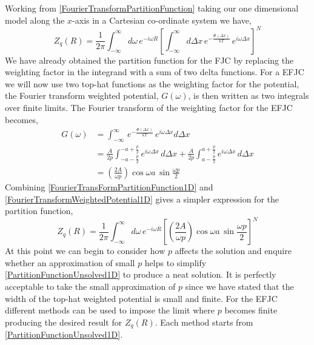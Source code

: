 Working from \eqref{FourierTransformPartitionFunction} taking our one dimensional model along the $x$-axis in a Cartesian co-ordinate system we have,
%
\begin{equation}
Z_{q}\left(R\right)=\frac{1}{2\pi}\int_{-\infty}^{\infty}d\omega\, e^{-i\omega R}\left[\int_{-\infty}^{\infty}d\Delta x\, e^{-\frac{\Phi\left(\Delta x\right)}{kT}}\, e^{i\omega\Delta x}\right]^{N}\label{FourierTransFormPartitionFunction1D}
\end{equation}
%
We have already obtained the partition function for the FJC by replacing the weighting factor in the integrand with a sum of two delta functions. For a EFJC we will now use two top-hat functions as the weighting factor for the potential, the Fourier transform weighted potential, $G\left(\omega\right)$, is then written as two integrals over finite limits. The Fourier transform of the weighting factor for the EFJC becomes,
%
\begin{align}
G\left(\omega\right) & =\int_{-\infty}^{\infty}\, e^{-\frac{\Phi\left(\Delta x\right)}{kT}}\, e^{i\omega\Delta x}d\Delta x\label{FTWP}\\
 & =\frac{A}{2p}\int_{-a-\frac{p}{2}}^{-a+\frac{p}{2}}e^{i\omega\Delta x}\, d\Delta x+\frac{A}{2p}\int_{a-\frac{p}{2}}^{a+\frac{p}{2}}e^{i\omega\Delta x}\, d\Delta x\\
 & =\left(\frac{2A}{\omega p}\right)\cos\omega a \, \sin \frac{\omega p}{2} \label{FourierTransformWeightedPotential1D}
\end{align}
%
Combining \eqref{FourierTransFormPartitionFunction1D} and \eqref{FourierTransformWeightedPotential1D} gives a simpler expression for the partition function,
%
\begin{equation}
Z_{q}\left(R\right)=\frac{1}{2\pi}\int_{-\infty}^{\infty}d\omega\, e^{-i\omega R}\left[\left(\frac{2A}{\omega p}\right)\cos\omega a\,\sin\frac{\omega p}{2}\right]^{N}\label{PartitionFunctionUnsolved1D}
\end{equation}
%
At this point we can begin to consider how $p$ affects the solution and enquire whether an approximation of small $p$ helps to simplify \eqref{PartitionFunctionUnsolved1D} to produce a neat solution. It is perfectly acceptable to take the small approximation of $p$ since we have stated that the width of the top-hat weighted potential is small and finite. For the EFJC different methods can be used to impose the limit where $p$ becomes finite producing the desired result for $Z_{q}\left(R\right)$. Each method starts from \eqref{PartitionFunctionUnsolved1D}.


